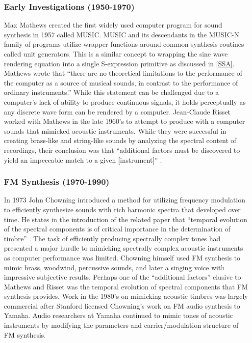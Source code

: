 \documentclass[12pt]{article}
\begin{document}
\subsubsection{Early Investigations (1950-1970)}
Max Mathews created the first widely used computer program for sound synthesis in 1957 called MUSIC. MUSIC and its descendants in the MUSIC-N family of programs utilize wrapper functions around common synthesis routines called unit generators. This is a similar concept to wrapping the sine wave rendering equation into a single S-expression primitive as discussed in \ref{SSA}. Mathews wrote that ``there are no theoretical limitations to the performance of the computer as a source of musical sounds, in contrast to the performance of ordinary instruments.'' \citep{mathews01111963} While this statement can be challenged due to a computer's lack of ability to produce continuous signals, it holds perceptually as any discrete wave form can be rendered by a computer. Jean-Claude Risset worked with Mathews in the late 1960's to attempt to produce with a computer sounds that mimicked acoustic instruments. While they were successful in creating brass-like and string-like sounds by analyzing the spectral content of recordings, their conclusion was that ``additional factors must be discovered to yield an impeccable match to a given [instrument]'' \citep{risset1969analysis}.

\subsubsection{FM Synthesis (1970-1990)}
In 1973 John Chowning introduced a method for utilizing frequency modulation to efficiently synthesize sounds with rich harmonic spectra that developed over time. He states in the introduction of the related paper that ``temporal evolution of the spectral components is of critical importance in the determination of timbre'' \citep{chowning1973synthesis}. The task of efficiently producing spectrally complex tones had presented a major hurdle to mimicking spectrally complex acoustic instruments as computer performance was limited. Chowning himself used FM synthesis to mimic brass, woodwind, percussive sounds, and later a singing voice \citep{chowning1989frequency} with impressive subjective results. Perhaps one of the ``additional factors'' elusive to Mathews and Risset was the temporal evolution of spectral components that FM synthesis provides.
Work in the 1980's on mimicking acoustic timbres was largely commercial after Stanford licensed Chowning's work on FM audio synthesis to Yamaha. Audio researchers at Yamaha continued to mimic tones of acoustic instruments by modifying the parameters and carrier/modulation structure of FM synthesis.
\end{document}
